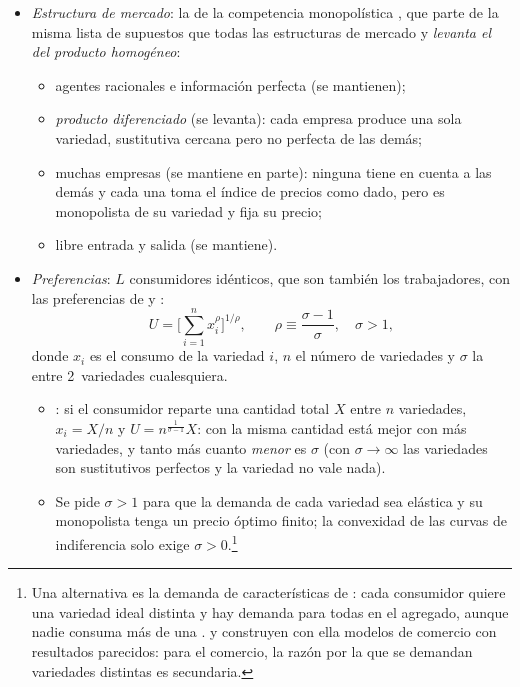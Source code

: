 \documentclass[11pt]{article}
\begin{document}
\begin{itemize}
\item \emph{Estructura de mercado}: la de la competencia monopolística , que parte de la misma lista de supuestos que todas las estructuras de mercado  y \emph{levanta el del producto homogéneo}:
  \begin{itemize}
  \item agentes racionales e información perfecta (se mantienen);
  \item \emph{producto diferenciado} (se levanta): cada empresa produce una sola variedad, sustitutiva cercana pero no perfecta de las demás;
  \item muchas empresas (se mantiene en parte): ninguna tiene en cuenta a las demás y cada una toma el índice de precios como dado, pero es monopolista de su variedad y fija su precio;
  \item libre entrada y salida (se mantiene).
  \end{itemize}
\item \emph{Preferencias}: $L$ consumidores idénticos, que son también los trabajadores, con las preferencias de  y  :
  $$U=\Big[\sum_{i=1}^{n}x_i^{\rho}\Big]^{1/\rho},\qquad \rho\equiv\frac{\sigma-1}{\sigma},\quad \sigma>1,$$
  donde $x_i$ es el consumo de la variedad $i$, $n$ el número de variedades y $\sigma$ la  entre 2~variedades cualesquiera.
  \begin{itemize}
  \item {}: si el consumidor reparte una cantidad total $X$ entre $n$ variedades, $x_i=X/n$ y $U=n^{\frac{1}{\sigma-1}}X$: con la misma cantidad está mejor con más variedades, y tanto más cuanto \emph{menor} es $\sigma$ (con $\sigma\to\infty$ las variedades son sustitutivos perfectos y la variedad no vale nada).
  \item Se pide $\sigma>1$ para que la demanda de cada variedad sea elástica y su monopolista tenga un precio óptimo finito; la convexidad de las curvas de indiferencia solo exige $\sigma>0$.\footnote{Una alternativa es la demanda de características de : cada consumidor quiere una variedad ideal distinta y hay demanda para todas en el agregado, aunque nadie consuma más de una . \textcite{Lancaster1980Intra} y \textcite{Helpman1981International} construyen con ella modelos de comercio con resultados parecidos: para el comercio, la razón por la que se demandan variedades distintas es secundaria.}

\end{itemize}
\end{itemize}
\end{document}
